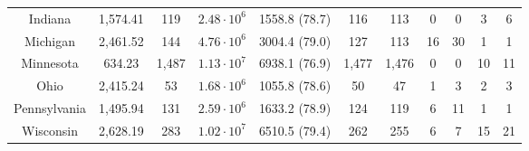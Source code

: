 \begin{refsection}[referencesCh4]
\begin{table}[h]
{\begin{threeparttable}
\begin{tabular}{@{}ccccccccccc@{}}
				Indiana           & 1,574.41                                                                                        & 119                                                                         & $2.48 \cdot 10^6$ & 1558.8 (78.7)                            & 116               & 113               & 0               & 0               & 3               & 6               \\
				Michigan          & 2,461.52                                                                                        & 144                                                                        & $4.76 \cdot 10^6$ & 3004.4 (79.0)                                                                               & 127              & 113               & 16              & 30              & 1               & 1               \\
				Minnesota         & 634.23                                                                                        & 1,487                                                                         & $1.13 \cdot 10^7$ & 6938.1 (76.9)                                                                                & 1,477                & 1,476                & 0               & 0               & 10              & 11              \\
				Ohio              & 2,415.24                                                                                        & 53                                                                         & $1.68 \cdot 10^6$ & 1055.8   (78.6)                                                                              & 50               & 47               & 1               & 3               & 2               & 3               \\
				Pennsylvania      & 1,495.94                                                                                        & 131                                                                         & $2.59 \cdot 10^6$ & 1633.2  (78.9)                                                                              & 124               & 119               & 6               & 11              & 1               & 1               \\
				Wisconsin         & 2,628.19                                                                                        & 283                                                                        & $1.02 \cdot 10^7$ & 6510.5 (79.4)                                                                               & 262              & 255              & 6               & 7              & 15              & 21              \\ \bottomrule

\end{tabular}
\end{threeparttable}}
\end{table}
\end{refsection}
